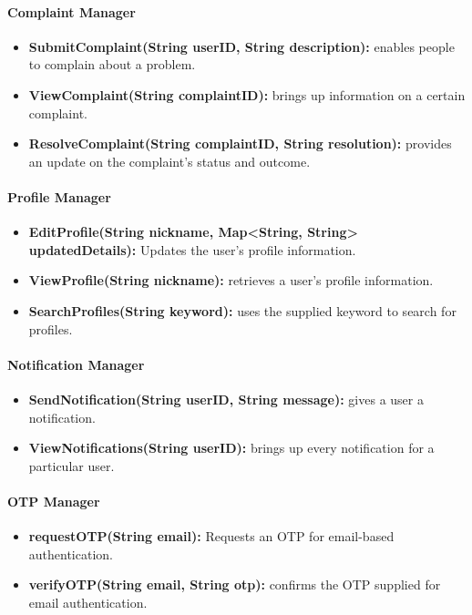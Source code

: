 \paragraph{Complaint Manager}
\begin{itemize}
    \item \textbf{SubmitComplaint(String userID, String description):} enables people to complain about a problem.
    \item \textbf{ViewComplaint(String complaintID):} brings up information on a certain complaint.
    \item \textbf{ResolveComplaint(String complaintID, String resolution):} provides an update on the complaint's status and outcome.
\end{itemize}

\paragraph{Profile Manager}
\begin{itemize}
    \item \textbf{EditProfile(String nickname, Map<String, String> updatedDetails):} Updates the user’s profile information.
    \item \textbf{ViewProfile(String nickname):} retrieves a user's profile information.
    \item \textbf{SearchProfiles(String keyword):} uses the supplied keyword to search for profiles.
\end{itemize}

\paragraph{Notification Manager}
\begin{itemize}
    \item \textbf{SendNotification(String userID, String message):} gives a user a notification.
    \item \textbf{ViewNotifications(String userID):} brings up every notification for a particular user.
\end{itemize}

\paragraph{OTP Manager}
\begin{itemize}
    \item \textbf{requestOTP(String email):} Requests an OTP for email-based authentication.
    \item \textbf{verifyOTP(String email, String otp):} confirms the OTP supplied for email authentication.
\end{itemize}

